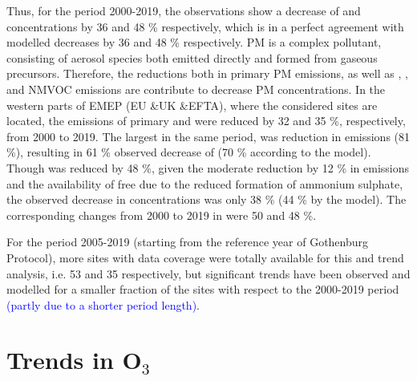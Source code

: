 Thus, for the period 2000-2019, the observations show a decrease of \PM[10] and \PM[2.5] concentrations by 36 and 48 \% respectively, which is in a perfect agreement with modelled decreases by 36 and 48 \% respectively. PM is a complex pollutant, consisting of aerosol species both emitted directly and formed from gaseous precursors. Therefore, the reductions both in primary PM emissions, as well as \sox, \noii, \nhiii and NMVOC emissions are contribute to decrease PM concentrations. In the western parts of EMEP (EU \&UK \&EFTA), where the considered sites are located, the emissions of primary \PM[10] and \PM[2.5] were reduced by 32 and 35 \%, respectively, from 2000 to 2019. The largest in the same period, was reduction in \sox emissions (81 \%), resulting in 61 \% observed decrease of \soiv (70 \% according to the model). Though \noii was reduced by 48 \%, given the moderate reduction by 12 \% in \nhiii emissions and the availability of free \nhiii due to the reduced formation of ammonium sulphate, the observed decrease in \noiii concentrations was only 38 \% (44 \% by the model). The corresponding changes from 2000 to 2019 in \nhiv were 50 and 48 \%.

For the period 2005-2019 (starting from the reference year of Gothenburg Protocol), more sites with data coverage were totally available for this \PM[10] and \PM[2.5] trend analysis, i.e. 53 and 35 respectively, but significant trends have been observed and modelled for a smaller fraction of the sites with respect to the 2000-2019 period \textcolor{blue}{(partly due to a shorter period length)}.




\section{\label{sec:Trends_O3 }Trends in O$_3$ }



